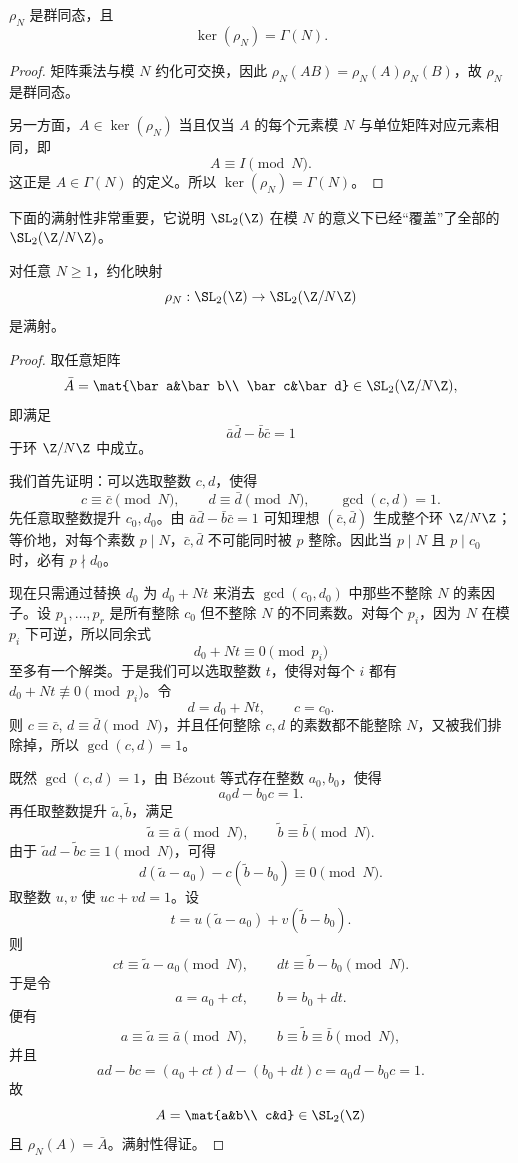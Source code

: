\begin{proposition}
$\rho_N$ 是群同态，且
\[
\ker(\rho_N)=\Gamma(N).
\]
\end{proposition}

\begin{proof}
矩阵乘法与模 $N$ 约化可交换，因此 $\rho_N(AB)=\rho_N(A)\rho_N(B)$，故 $\rho_N$ 是群同态。

另一方面，$A\in \ker(\rho_N)$ 当且仅当 $A$ 的每个元素模 $N$ 与单位矩阵对应元素相同，即
\[
A\equiv I \pmod N.
\]
这正是 $A\in \Gamma(N)$ 的定义。所以 $\ker(\rho_N)=\Gamma(N)$。
\end{proof}

下面的满射性非常重要，它说明 $\SL_2(\Z)$ 在模 $N$ 的意义下已经“覆盖”了全部的 $\SL_2(\Z/N\Z)$。

\begin{theorem}
对任意 $N\ge 1$，约化映射
\[
\rho_N:\SL_2(\Z)\to \SL_2(\Z/N\Z)
\]
是满射。
\end{theorem}

\begin{proof}
取任意矩阵
\[
\bar A=\mat{\bar a&\bar b\\ \bar c&\bar d}\in \SL_2(\Z/N\Z),
\]
即满足
\[
\bar a\bar d-\bar b\bar c=1
\]
于环 $\Z/N\Z$ 中成立。

我们首先证明：可以选取整数 $c,d$，使得
\[
c\equiv \bar c\pmod N,
\qquad d\equiv \bar d\pmod N,
\qquad \gcd(c,d)=1.
\]
先任意取整数提升 $c_0,d_0$。由 $\bar a\bar d-\bar b\bar c=1$ 可知理想 $(\bar c,\bar d)$ 生成整个环 $\Z/N\Z$；等价地，对每个素数 $p\mid N$，$\bar c,\bar d$ 不可能同时被 $p$ 整除。因此当 $p\mid N$ 且 $p\mid c_0$ 时，必有 $p\nmid d_0$。

现在只需通过替换 $d_0$ 为 $d_0+Nt$ 来消去 $\gcd(c_0,d_0)$ 中那些不整除 $N$ 的素因子。设 $p_1,\dots,p_r$ 是所有整除 $c_0$ 但不整除 $N$ 的不同素数。对每个 $p_i$，因为 $N$ 在模 $p_i$ 下可逆，所以同余式
\[
d_0+Nt\equiv 0\pmod{p_i}
\]
至多有一个解类。于是我们可以选取整数 $t$，使得对每个 $i$ 都有 $d_0+Nt\not\equiv 0\pmod{p_i}$。令
\[
d=d_0+Nt,
\qquad c=c_0.
\]
则 $c\equiv \bar c$, $d\equiv \bar d\pmod N$，并且任何整除 $c,d$ 的素数都不能整除 $N$，又被我们排除掉，所以 $\gcd(c,d)=1$。

既然 $\gcd(c,d)=1$，由 Bézout 等式存在整数 $a_0,b_0$，使得
\[
a_0d-b_0c=1.
\]
再任取整数提升 $\tilde a,\tilde b$，满足
\[
\tilde a\equiv \bar a\pmod N,
\qquad \tilde b\equiv \bar b\pmod N.
\]
由于 $\tilde a d-\tilde b c\equiv 1\pmod N$，可得
\[
d(\tilde a-a_0)-c(\tilde b-b_0)\equiv 0\pmod N.
\]
取整数 $u,v$ 使 $uc+vd=1$。设
\[
t=u(\tilde a-a_0)+v(\tilde b-b_0).
\]
则
\[
ct\equiv \tilde a-a_0 \pmod N,
\qquad
dt\equiv \tilde b-b_0 \pmod N.
\]
于是令
\[
a=a_0+ct,
\qquad b=b_0+dt.
\]
便有
\[
a\equiv \tilde a\equiv \bar a\pmod N,
\qquad b\equiv \tilde b\equiv \bar b\pmod N,
\]
并且
\[
ad-bc=(a_0+ct)d-(b_0+dt)c=a_0d-b_0c=1.
\]
故
\[
A=\mat{a&b\\ c&d}\in \SL_2(\Z)
\]
且 $\rho_N(A)=\bar A$。满射性得证。
\end{proof}

